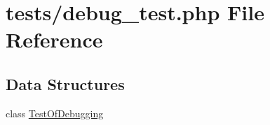 \hypertarget{debug__test_8php}{\section{tests/debug\-\_\-test.php File Reference}
\label{debug__test_8php}
}
\subsection*{Data Structures}
\begin{DoxyCompactItemize}
\item 
class \hyperlink{class_test_of_debugging}{Test\-Of\-Debugging}
\end{DoxyCompactItemize}
